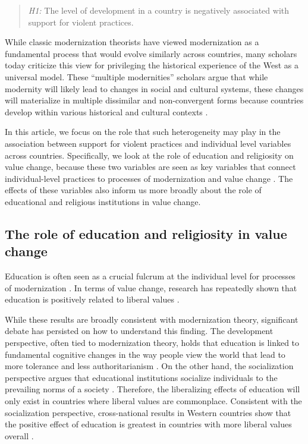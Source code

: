 \documentclass[10pt,letterpaper]{article}
\begin{document}
\begin{quote}
\emph{H1:} The level of development in a country is negatively associated with support for violent practices.
\end{quote}

While classic modernization theorists have viewed modernization as a fundamental process that would evolve similarly across countries, many scholars today criticize this view for privileging the historical experience of the West as a universal model. These ``multiple modernities'' scholars argue that while modernity will likely lead to changes in social and cultural systems, these changes will materialize in multiple dissimilar and non-convergent forms because countries develop within various historical and cultural contexts \cite{hefner_multiple_1998, eisenstadt_multiple_2000, kamali_multiple_2006, casanova_cosmopolitanism_2011}.

In this article, we focus on the role that such heterogeneity may play in the association between support for violent practices and individual level variables across countries. Specifically, we look at the role of education and religiosity on value change, because these two variables are seen as key variables that connect individual-level practices to processes of modernization and value change \cite{scheepers_education_2002}. The effects of these variables also inform us more broadly about the role of educational and religious institutions in value change.

\subsection*{The role of education and religiosity in value change}

Education is often seen as a crucial fulcrum at the individual level for processes of modernization \cite{meyer_effects_1977, chabbott_development_2000, depaepe_educationalization_2008}. In terms of value change, research has repeatedly shown that education is positively related to liberal values \cite{hyman_education_1979, bobo_education_1989, weakliem_effects_2002, kingston_why_2003}.

While these results are broadly consistent with modernization theory, significant debate has persisted on how to understand this finding. The development perspective, often tied to modernization theory, holds that education is linked to fundamental cognitive changes in the way people view the world that lead to more tolerance and less authoritarianism \cite{adorno_authoritarian_1950, mcclosky_dimensions_1983}. On the other hand, the socialization perspective argues that educational institutions socialize individuals to the prevailing norms of a society \cite{selznick_tenacity_1969, jackman_education_1984, phelan_education_1995}. Therefore, the liberalizing effects of education will only exist in countries where liberal values are commonplace. Consistent with the socialization perspective, cross-national results in Western countries show that the positive effect of education is greatest in countries with more liberal values overall \cite{weil_variable_1985}.
\end{document}

